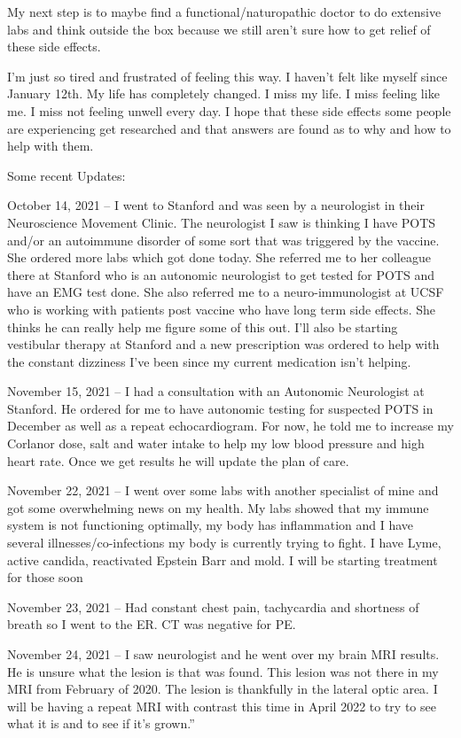 My next step is to maybe find a functional/naturopathic doctor to do extensive
labs and think outside the box because we still aren’t sure how to get relief of
these side effects.

I’m just so tired and frustrated of feeling this way. I haven’t felt like myself
since January 12th. My life has completely changed. I miss my life. I miss
feeling like me. I miss not feeling unwell every day. I hope that these side
effects some people are experiencing get researched and that answers are found
as to why and how to help with them.

Some recent Updates:

October 14, 2021 – I went to Stanford and was seen by a neurologist in their
Neuroscience Movement Clinic. The neurologist I saw is thinking I have POTS
and/or an autoimmune disorder of some sort that was triggered by the
vaccine. She ordered more labs which got done today. She referred me to her
colleague there at Stanford who is an autonomic neurologist to get tested for
POTS and have an EMG test done. She also referred me to a neuro-immunologist at
UCSF who is working with patients post vaccine who have long term side
effects. She thinks he can really help me figure some of this out. I’ll also be
starting vestibular therapy at Stanford and a new prescription was ordered to
help with the constant dizziness I’ve been since my current medication isn’t
helping.

November 15, 2021 – I had a consultation with an Autonomic Neurologist at
Stanford. He ordered for me to have autonomic testing for suspected POTS in
December as well as a repeat echocardiogram. For now, he told me to increase my
Corlanor dose, salt and water intake to help my low blood pressure and high
heart rate. Once we get results he will update the plan of care.

November 22, 2021 – I went over some labs with another specialist of mine and
got some overwhelming news on my health. My labs showed that my immune system is
not functioning optimally, my body has inflammation and I have several
illnesses/co-infections my body is currently trying to fight. I have Lyme,
active candida, reactivated Epstein Barr and mold. I will be starting treatment
for those soon

November 23, 2021 – Had constant chest pain, tachycardia and shortness of breath
so I went to the ER. CT was negative for PE.

November 24, 2021 – I saw neurologist and he went over my brain MRI results. He
is unsure what the lesion is that was found. This lesion was not there in my MRI
from February of 2020. The lesion is thankfully in the lateral optic area. I
will be having a repeat MRI with contrast this time in April 2022 to try to see
what it is and to see if it’s grown.”
